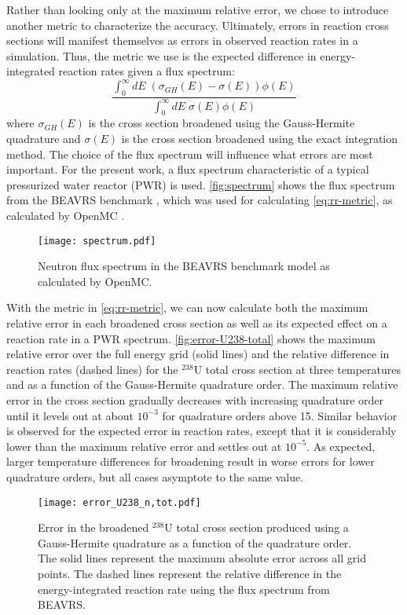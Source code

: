 \documentclass[3p,authoryear]{elsarticle}
\begin{document}
Rather than looking only at the maximum relative error, we chose to introduce
another metric to characterize the accuracy. Ultimately, errors in reaction
cross sections will manifest themselves as errors in observed reaction rates in
a simulation. Thus, the metric we use is the expected difference in
energy-integrated reaction rates given a flux spectrum:
\begin{equation}
  \label{eq:rr-metric}
  \frac{\int_0^{\infty} dE \; \left ( \sigma_{GH}(E) - \sigma(E) \right )
    \phi(E)}{\int_0^{\infty} dE \; \sigma(E) \phi(E)}
\end{equation}
where $\sigma_{GH}(E)$ is the cross section broadened using the Gauss-Hermite
quadrature and $\sigma(E)$ is the cross section broadened using the exact
integration method.  The choice of the flux spectrum will influence what errors
are most important. For the present work, a flux spectrum characteristic of a
typical pressurized water reactor (PWR) is used. \autoref{fig:spectrum} shows
the flux spectrum from the BEAVRS benchmark \citep{mc-horelik-2013}, which was
used for calculating \autoref{eq:rr-metric}, as calculated by OpenMC
\citep{ane-romano-2013}.
\begin{figure}[htbp]
  \centering
  \texttt{[image: spectrum.pdf]}
  \caption{Neutron flux spectrum in the BEAVRS benchmark model as calculated by
    OpenMC.}
  \label{fig:spectrum}
\end{figure}

With the metric in \autoref{eq:rr-metric}, we can now calculate both the maximum
relative error in each broadened cross section as well as its expected effect on
a reaction rate in a PWR spectrum. \autoref{fig:error-U238-total} shows the
maximum relative error over the full energy grid (solid lines) and the relative
difference in reaction rates (dashed lines) for the $^{238}$U total cross
section at three temperatures and as a function of the Gauss-Hermite quadrature
order. The maximum relative error in the cross section gradually decreases with
increasing quadrature order until it levels out at about $10^{-3}$ for
quadrature orders above 15. Similar behavior is observed for the expected error
in reaction rates, except that it is considerably lower than the maximum
relative error and settles out at $10^{-5}$. As expected, larger temperature
differences for broadening result in worse errors for lower quadrature orders,
but all cases asymptote to the same value.
\begin{figure}[H]
  \centering
  \texttt{[image: error\_U238\_n,tot.pdf]}
  \caption{Error in the broadened $^{238}$U total cross section produced using a
    Gauss-Hermite quadrature as a function of the quadrature order. The solid
    lines represent the maximum absolute error across all grid points. The
    dashed lines represent the relative difference in the energy-integrated
    reaction rate using the flux spectrum from BEAVRS.}
  \label{fig:error-U238-total}
\end{figure}
\end{document}
